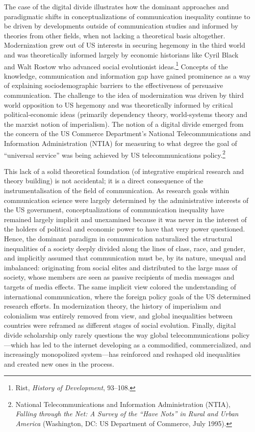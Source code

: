 \documentclass{tufte-handout}
\begin{document}
The case of the digital divide illustrates how the dominant approaches
and paradigmatic shifts in conceptualizations of communication
inequality continue to be driven by developments outside of
communication studies and informed by theories from other fields, when
not lacking a theoretical basis altogether. Modernization grew out of US
interests in securing hegemony in the third world and was theoretically
informed largely by economic historians like Cyril Black and Walt Rostow
who advanced social evolutionist ideas.\footnote{Rist, \emph{History of
  Development}, 93--108.} Concepts of the knowledge, communication and
information gap have gained prominence as a way of explaining
sociodemographic barriers to the effectiveness of persuasive
communication. The challenge to the idea of modernization was driven by
third world opposition to US hegemony and was theoretically informed by
critical political-economic ideas (primarily dependency theory,
world-systems theory and the marxist notion of imperialism). The notion
of a digital divide emerged from the concern of the US Commerce
Department's National Telecommunications and Information Administration
(NTIA) for measuring to what degree the goal of ``universal service''
was being achieved by US telecommunications policy.\footnote{National
  Telecommunications and Information Administration (NTIA),
  \emph{Falling through the Net: A Survey of the ``Have Nots'' in Rural
  and Urban America} (Washington, DC: US Department of Commerce, July
  1995).}

This lack of a solid theoretical foundation (of integrative empirical
research and theory building) is not accidental; it is a direct
consequence of the instrumentalisation of the field of communication. As
research goals within communication science were largely determined by
the administrative interests of the US government, conceptualizations of
communication inequality have remained largely implicit and unexamined
because it was never in the interest of the holders of political and
economic power to have that very power questioned. Hence, the dominant
paradigm in communication naturalized the structural inequalities of a
society deeply divided along the lines of class, race, and gender, and
implicitly assumed that communication must be, by its nature, unequal
and imbalanced: originating from social elites and distributed to the
large mass of society, whose members are seen as passive recipients of
media messages and targets of media effects. The same implicit view
colored the understanding of international communication, where the
foreign policy goals of the US determined research efforts. In
modernization theory, the history of imperialism and colonialism was
entirely removed from view, and global inequalities between countries
were reframed as different stages of social evolution. Finally, digital
divide scholarship only rarely questions the way global
telecommunications policy---which has led to the internet developing as
a commodified, commercialized, and increasingly monopolized system---has
reinforced and reshaped old inequalities and created new ones in the
process.
\end{document}

